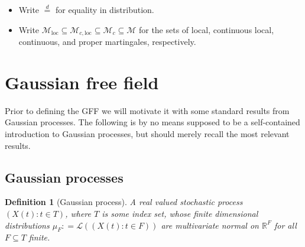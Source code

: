 \documentclass[11pt,reqno]{amsart}
\numberwithin{equation}{section}
\newtheorem{defi}[thm]{Definition}
\newcommand{\eqby}[1]{\mathrel{\stackrel{#1}{=}}}
\newcommand{\deq}{\mathrel{\mathop:}=}
\begin{document}
\begin{itemize}
	\item Write $\eqby{d}$ for equality in distribution.
	\item Write $\mathcal M_\text{loc}\subseteq\mathcal M_{c,\text{loc}}\subseteq\mathcal M_c\subseteq\mathcal M$ for the sets of local, continuous local, continuous, and proper martingales, respectively.
\end{itemize}

\newpage\section{Gaussian free field}

Prior to defining the GFF we will motivate it with some standard results from Gaussian processes. The following is by no means supposed to be a self-contained introduction to Gaussian processes, but should merely recall the most relevant results.

\subsection{Gaussian processes}

\begin{defi}[Gaussian process]
	A real valued stochastic process $(X(t):t\in T)$, where $T$ is some index set, whose finite dimensional distributions $\mu_F\deq \mathcal L((X(t):t\in F))$ are multivariate normal on $\mathbb R^F$ for all $F\subseteq T$ finite.
\end{defi}
\end{document}
